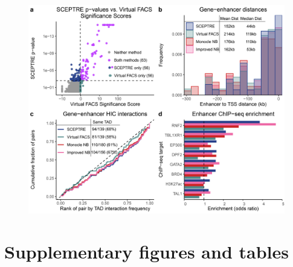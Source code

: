 \documentclass{article}
\begin{document}
\clearpage
\clearpage
\begin{figure}[h]
	\includegraphics[width = \textwidth]{Figure5.png}
	\caption{}
	\label{fig:application-xie}
\end{figure}

\clearpage
\section*{Supplementary figures and tables}
\setcounter{figure}{0}    
\renewcommand{\thefigure}{S\arabic{figure}}
\end{document}
